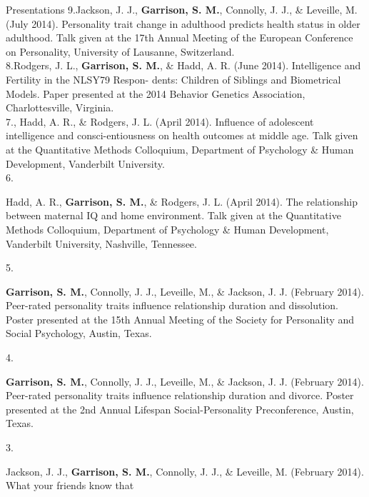 \documentclass {resume}
\newcommand{\meb}{{\bf Garrison, S. M.}\xspace}
\begin{document}
\begin{rSection}{\textrm{Presentations}}
9.\hspace* {2.5mm}Jackson, J. J., \meb, Connolly, J. J., \& Leveille, M. (July 2014). Personality trait change in \hspace* {6 mm}adulthood predicts health status in older adulthood. Talk given at the 17th Annual Meeting of the European \hspace* {6 mm}Conference on Personality, University of Lausanne, Switzerland.
\smallskip\\
8.\hspace* {2.5mm}Rodgers, J. L., \meb, \& Hadd, A. R. (June 2014). Intelligence and Fertility in the NLSY79 Respon-
\hspace* {6 mm}dents: Children of Siblings and Biometrical Models. Paper presented at the 2014 Behavior Genetics Association, \hspace* {6 mm}Charlottesville, Virginia. 
\smallskip\\
7.\hspace* {2.5 mm}\meb, Hadd, A. R., \& Rodgers, J. L. (April 2014). Influence of adolescent intelligence and consci-\hspace* {6 mm}entiousness on health outcomes at middle age. Talk given at the Quantitative Methods Colloquium, Department \hspace* {6 mm}of Psychology \& Human Development, Vanderbilt University. \smallskip\\
6.\hspace* {2.5 mm}\begin{samepage}Hadd, A. R., \meb, \& Rodgers, J. L. (April 2014). The relationship between maternal IQ and \hspace* {6 mm}home environment. Talk given at the Quantitative Methods Colloquium, Department of Psychology \& Human \hspace* {6 mm}Development, Vanderbilt University, Nashville, Tennessee. \smallskip\\\end{samepage}%
5.\hspace* {2.5 mm}\begin{samepage}\meb, Connolly, J. J., Leveille, M., \& Jackson, J. J. (February 2014). Peer-rated personality traits \hspace* {6 mm}influence relationship duration and dissolution. Poster presented at the 15th Annual Meeting of the Society for \hspace* {6 mm}Personality and Social Psychology, Austin, Texas.\smallskip\\\end{samepage}
4.\hspace* {2.5 mm}\begin{samepage}\meb, Connolly, J. J., Leveille, M., \& Jackson, J. J. (February 2014). Peer-rated personality traits \hspace* {6 mm}influence relationship duration and divorce. Poster presented at the 2nd Annual Lifespan Social-Personality  \hspace* {6 mm}Preconference, Austin, Texas.\smallskip\\\end{samepage}
3.\hspace* {2.5 mm}\begin{samepage}Jackson, J. J., \textbf{Garrison, S. M.}, Connolly, J. J., \& Leveille, M. (February 2014). What your friends know that\\ 

\end{samepage}
\end{rSection}
\end{document}

